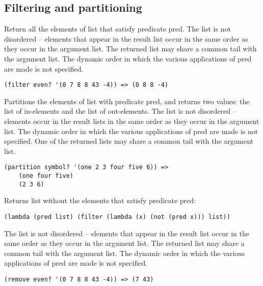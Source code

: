 \subsection{Filtering and partitioning}

\begin{entry}{%
  }
 
  Return all the
  elements of list that satisfy predicate pred. The list is not
  disordered -- elements that appear in the result list occur in the
  same order as they occur in the argument list. The returned list may
  share a common tail with the argument list. The dynamic order in
  which the various applications of pred are made is not specified.

\begin{verbatim}
(filter even? '(0 7 8 8 43 -4)) => (0 8 8 -4)
\end{verbatim}
\end{entry}

\begin{entry}{%
  }

  Partitions the elements of list with predicate pred, and returns two
  values: the list of in-elements and the list of out-elements. The
  list is not disordered -- elements occur in the result lists in the
  same order as they occur in the argument list. The dynamic order in
  which the various applications of pred are made is not
  specified. One of the returned lists may share a common tail with
  the argument list.

\begin{verbatim}
(partition symbol? '(one 2 3 four five 6)) => 
    (one four five)
    (2 3 6)
\end{verbatim}
\end{entry}

\begin{entry}{%
  }

  Returns list
  without the elements that satisfy predicate pred:

\begin{verbatim}
(lambda (pred list) (filter (lambda (x) (not (pred x))) list))
\end{verbatim}

  The list is not disordered -- elements that appear in the result
  list occur in the same order as they occur in the argument list. The
  returned list may share a common tail with the argument list. The
  dynamic order in which the various applications of pred are made is
  not specified.

\begin{verbatim}
(remove even? '(0 7 8 8 43 -4)) => (7 43)
\end{verbatim}
\end{entry}

